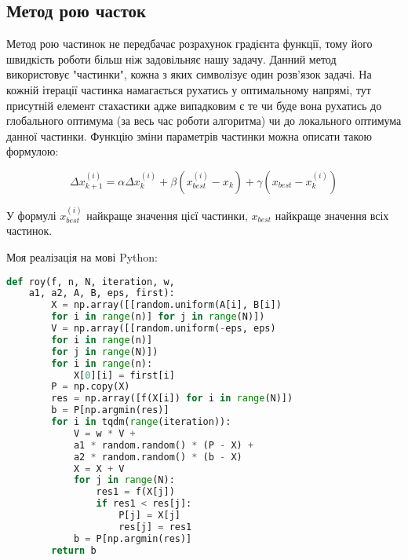 \subsection{Метод рою часток}


Метод рою частинок не передбачає розрахунок градієнта функції, тому його 
швидкість роботи більш ніж задовільняє нашу задачу.
Данний метод використовує "частинки", кожна з яких символізує один
розв'язок задачі. На кожній ітерації частинка намагається рухатись у 
оптимальному напрямі, тут присутній елемент стахастики адже випадковим є те 
чи буде вона рухатись до глобального оптимума (за весь час 
роботи алгоритма) чи до локального оптимума данної частинки. 
Функцію зміни параметрів частинки можна описати такою формулою: 

$$\Delta x_{k + 1}^{(i)} = \alpha \Delta x_k^{(i)} + 
\beta (x_{best}^{(i)} - x_k) + \gamma(x_{best} - x_k^{(i)})$$


У формулі $x_{best}^{(i)}$ найкраще значення цієї частинки, 
$x_{best}$ найкраще значення всіх частинок. 


Моя реалізація на мові Python:

\begin{lstlisting}[language=Python, caption=Python example]
    def roy(f, n, N, iteration, w, 
    a1, a2, A, B, eps, first):
        X = np.array([[random.uniform(A[i], B[i]) 
        for i in range(n)] for j in range(N)])
        V = np.array([[random.uniform(-eps, eps) 
        for i in range(n)] 
        for j in range(N)])
        for i in range(n):
            X[0][i] = first[i]
        P = np.copy(X)
        res = np.array([f(X[i]) for i in range(N)])
        b = P[np.argmin(res)]
        for i in tqdm(range(iteration)):
            V = w * V + 
            a1 * random.random() * (P - X) + 
            a2 * random.random() * (b - X)
            X = X + V
            for j in range(N):
                res1 = f(X[j])
                if res1 < res[j]:
                    P[j] = X[j]
                    res[j] = res1
            b = P[np.argmin(res)]
        return b
\end{lstlisting}


